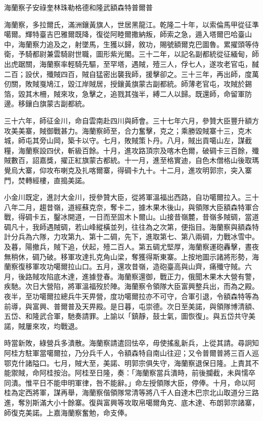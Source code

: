
\begin{pinyinscope}
海蘭察子安祿奎林珠勒格德和隆武額森特普爾普

海蘭察，多拉爾氏，滿洲鑲黃旗人，世居黑龍江。乾隆二十年，以索倫馬甲從征準噶爾。輝特臺吉巴雅爾既降，復從阿睦爾撒納叛，師索之急，遁入塔爾巴哈臺山中，海蘭察力追及之，射墜馬，生獲以歸，敘功，賜號額爾克巴圖魯。累擢頭等侍衛，予騎都尉兼雲騎尉世職，圖形紫光閣。三十二年，以記名副都統從征緬甸，師出虎踞關，海蘭察率輕騎先驅，至罕塔，遇賊，殪三人，俘七人，遂攻老官屯，馘二百；設伏，殲賊四百，賊自猛密出襲我師，援擊卻之。三十三年，再出師，度萬仞關，敗賊戛鳩江，毀江岸賊居，授鑲黃旗蒙古副都統。師薄老官屯，攻賊於錫箔，毀其木柵，賊來攻，急擊之，追戮其強半，縛二人以歸。既還師，命留軍防邊。移鑲白旗蒙古副都統。

三十六年，師征金川，命自雲南赴四川與師會。三十七年六月，參贊大臣豐升額方攻美美寨，賊御戰甚力。海蘭察師至，合力奮擊，克之；乘勝毀賊寨十三，克木城，師屯其旁山岡，築卡以守。七月，敗賊策卜丹。八月，賊出貢噶山左，謀截糧，海蘭察設四伏，斬級百餘。十月，進攻路頂宗及喀木色爾，破碉卡三百餘，殲賊數百，詔嘉獎，擢正紅旗蒙古都統。十一月，進至格實迪，自色木僧格山後取瑪覺烏大寨，仰攻布喇克及扎喀爾寨，得碉卡九十。十二月，進攻明郭宗，突入寨門，焚轉經樓，直搗美諾。

小金川既定，進討大金川，授參贊大臣，從將軍溫福出西路，自功噶爾拉入。三十八年二月，趨昔嶺，道經蘇克奈，奪卡二，據木果木後山，與領隊大臣額森特軍合戰，得碉卡五，鑿冰開道，一日而至固木卜爾山。山接昔嶺麓，昔嶺多賊碉，當道碉凡十，我師遇賊碉，若山峰縱橫並列，往往為之次第，便指目。海蘭察與額森特計分兵為六隊，力攻第九、第十二碉，先下，進取第七、第八兩碉，力戰冰雪中。及暮，陽撤兵，賊下追，伏起，殪二百人。第五碉尤堅厚，海蘭察運砲轟擊，晝夜無稍休，碉乃破。移軍攻達扎克角山梁，奪獲得斯東寨。上按地圖示諸將形勢，海蘭察復移軍攻功噶爾拉山口。五月，還攻昔嶺，造砲臺高與山齊，痛殲守賊。六月，後路賊攻陷底木達，進據登春。海蘭察還御，戰正力，俄聞木果木大營有警，疾馳。次日大營陷，將軍溫福歿於陣。海蘭察令領隊大臣富興整兵出，而為之殿。夜半，至功噶爾拉總兵牛天畀營，度功噶爾拉亦不可守，合軍引退，令額森特等為前導，與富興、普爾普及天畀殿。是日暮，屯崇德。次日至美諾，與領隊博清額、五岱、和隆武合軍，馳奏請罪。上諭以「鎮靜，鼓士氣，圖恢復」。與五岱共守美諾，賊屢來攻，均戰退。

時當新敗，綠營兵多潰散。海蘭察請遣回怯卒，毋使搖亂新兵，上從其請。尋詗知阿桂方駐軍當噶爾拉，乃分兵千人，令額森特自南山往迎；又令普爾普將三百人巡鄂克什諸隘口。七月，賊大至，美諾、明郭宗俱失守，海蘭察退保日隆。上責其不能禦賊，命阿桂按治。阿桂至日隆，奏：「海蘭察當兵潰時，前後攔截，未與懦卒同潰。惟平日不能申明軍律，咎不能辭。」命左授領隊大臣，停俸。十月，命以阿桂為定西將軍，謀再舉，海蘭察偕領隊常清等將八千人自達木巴宗北山取道分三路進，奪別斯滿大小十餘寨。復與富興等攻取帛噶爾角克、底木達、布朗郭宗諸寨，師復克美諾。上嘉海蘭察奮勉，命支俸。


\end{pinyinscope}
